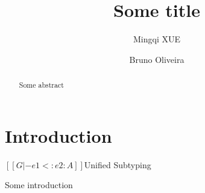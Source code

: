\documentclass{llncs}
\begin{document}
\title{Some title}

\author{Mingqi XUE \and Bruno Oliveira}

\maketitle

\begin{abstract}
    Some abstract
\end{abstract}

\section{Introduction}

\begin{drulepar}{$[[G |- e1 <: e2 : A]]$}{Unified Subtyping}
\end{drulepar}

Some introduction
\end{document}
